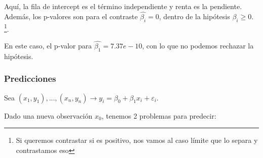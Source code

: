 Aquí, la fila de intercept es el término independiente y renta es la pendiente. Además, los p-valores son para el contraste $\hat{β_i} = 0$, dentro de la hipótesis $β_i \geq 0$. \footnote{Si queremos contrastar si es positivo, nos vamos al caso límite que lo separa y contrastamos eso}.

En este caso, el p-valor para $\hat{β_1} = 7.37e-10$, con lo que no podemos rechazar la hipótesis.


\subsubsection{Predicciones}

Sea $(x_1,y_1),...,(x_n,y_n) \to y_i = β_0 + β_1x_i + ε_i$.

Dado una nueva observación $x_0$, tenemos 2 problemas para predecir:

